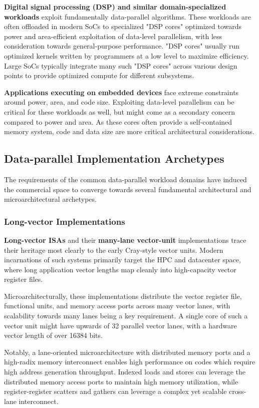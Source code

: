 \textbf{Digital signal processing (DSP) and similar domain-specialized workloads} exploit fundamentally data-parallel algorithms.
These workloads are often offloaded in modern SoCs to specialized "DSP cores" optimized towards power and area-efficient exploitation of data-level parallelism, with less consideration towards general-purpose performance.
"DSP cores" usually run optimized kernels written by programmers at a low level to maximize efficiency. 
Large SoCs typically integrate many such "DSP cores" across various design points to provide optimized compute for different subsystems.

\textbf{Applications executing on embedded devices} face extreme constraints around power, area, and code size.
Exploiting data-level parallelism can be critical for these workloads as well, but might come as a secondary concern compared to power and area.
As these cores often provide a self-contained memory system, code and data size are more critical architectural considerations.

\subsection{Data-parallel Implementation Archetypes}

The requirements of the common data-parallel workload domains have induced the commercial space to converge towards several fundamental architectural and microarchitectural archetypes.

\subsubsection{Long-vector Implementations}

\textbf{Long-vector ISAs} and their \textbf{many-lane vector-unit} implementations trace their heritage most clearly to the early Cray-style vector units.
Modern incarnations of such systems primarily target the HPC and datacenter space, where long application vector lengths map cleanly into high-capacity vector register files.

Microarchitecturally, these implementations distribute the vector register file, functional units, and memory access ports across many vector lanes, with scalability towards many lanes being a key requirement.
A single core of such a vector unit might have upwards of 32 parallel vector lanes, with a hardware vector length of over 16384 bits.

Notably, a lane-oriented microarchitecture with distributed memory ports and a high-radix memory interconnect enables high performance on codes which require high address generation throughput.
Indexed loads and stores can leverage the distributed memory access ports to maintain high memory utilization, while register-register scatters and gathers can leverage a complex yet scalable cross-lane interconnect.

